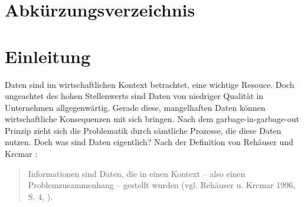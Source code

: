 \documentclass[12pt,a4paper,bibliography=totocnumbered,listof=totocnumbered]{scrartcl}
\begin{document}
\section{Abkürzungsverzeichnis}
\begin{acronym}[OSGi] %
	\setlength{\itemsep}{-\parsep} %
\end{acronym}
\newpage


\renewcommand{\sectionmark}[1]{\markright{#1}}
\renewcommand{\subsectionmark}[1]{}
\renewcommand{\subsubsectionmark}[1]{}
\rhead{\rightmark}

\onehalfspacing
\renewcommand{\thesection}{\arabic{section}}
\renewcommand{\theHsection}{\arabic{section}}
\setcounter{section}{0}
\setcounter{page}{1}

\section{Einleitung}
Daten sind im wirtschaftlichen Kontext betrachtet, eine wichtige Resouce. Doch ungeachtet des hohen Stellenwerts sind Daten von niedriger Qualität in Unternehmen allgegenwärtig. Gerade diese, mangelhaften Daten können wirtschaftliche Konsequenzen mit sich bringen. Nach dem garbage-in-garbage-out Prinzip zieht sich die Problematik durch sämtliche Prozesse, die diese Daten nutzen. Doch was sind Daten eigentlich? Nach der Definition von Reh{\"a}user und Krcmar :
\begin{quote}
Informationen sind 
Daten, die in einen Kontext – also einen Problemzusammenhang – gestellt wurden (vgl. Rehäuser u. Krcmar 1996, S. 4, \cite{rehauser}).
\end{quote}
\end{document}
